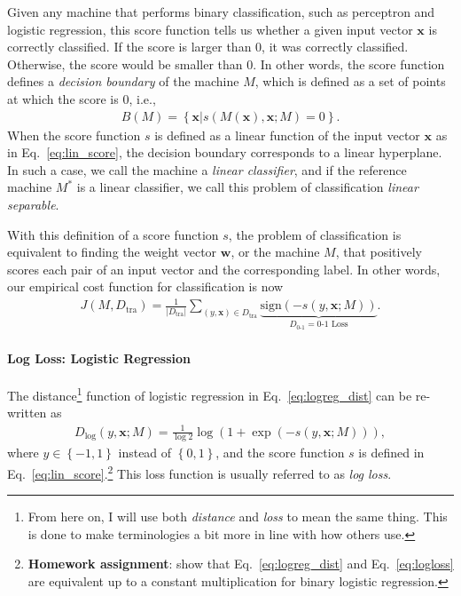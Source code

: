 \documentclass{report}
\newcommand{\vect}[1]{\mathbf{#1}}
\newcommand{\vx}[0]{\vect{x}}
\newcommand{\vw}[0]{\vect{w}}
\newcommand{\sign}{\text{sign}}
\begin{document}
Given any machine that performs binary classification, such as perceptron and
logistic regression, this score function tells us whether a given input vector
$\vx$ is correctly classified. If the score is larger than 0, it was correctly
classified. Otherwise, the score would be smaller than 0. In other words, the
score function defines a {\it decision boundary} of the machine $M$, which is
defined as a set of points at which the score is $0$, i.e.,
\begin{align*}
    B(M) = \left\{ \vx | s(M(\vx), \vx; M) = 0 \right\}.
\end{align*}
When the score function $s$ is defined as a linear function of the input vector
$\vx$ as in Eq.~\eqref{eq:lin_score}, the decision boundary corresponds to a
linear hyperplane. In such a case, we call the machine a {\it linear
classifier}, and if the reference machine $M^*$ is a linear classifier, we call
this problem of classification {\it linear separable}.

With this definition of a score function $s$, the problem of classification is
equivalent to finding the weight vector $\vw$, or the machine $M$, that
positively scores each pair of an input vector and the corresponding label. In
other words, our empirical cost function for classification is now 
\begin{align}
    \label{eq:0-1_loss}
    J(M, D_{\text{tra}}) = \frac{1}{|D_{\text{tra}}|} \sum_{(y, \vx) \in D_{\text{tra}}} 
    \underbrace{\sign(-s(y, \vx; M))}_{
        D_{\text{0-1}} = \text{0-1 Loss}
    }.
\end{align}

\paragraph{Log Loss: Logistic Regression}

The distance\footnote{
    From here on, I will use both {\it distance} and {\it loss} to mean the same
    thing. This is done to make terminologies a bit more in line with how
    others use.
}
function of logistic regression in Eq.~\eqref{eq:logreg_dist} can be re-written
as
\begin{align}
    \label{eq:logloss}
    D_{\log}(y, \vx; M) = \frac{1}{\log 2} \log(1+\exp(-s(y, \vx; M))),
\end{align}
where $y \in \left\{ -1, 1\right\}$ instead of $\left\{ 0, 1 \right\}$, and the
score function $s$ is defined in Eq.~\eqref{eq:lin_score}.\footnote{
    {\bf Homework assignment}: show that Eq.~\eqref{eq:logreg_dist} and
    Eq.~\eqref{eq:logloss} are equivalent up to a constant multiplication for
    binary logistic regression.
} This loss function is usually referred to as {\it log loss}.
\end{document}
